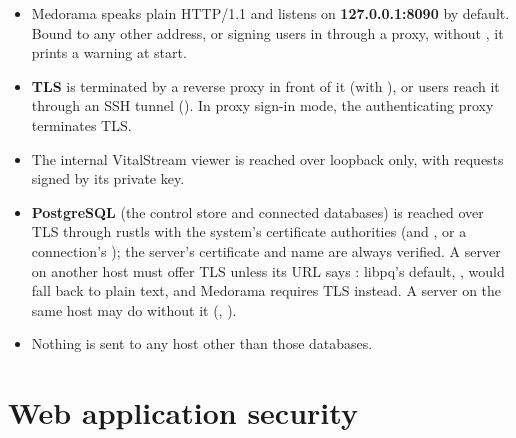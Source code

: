 \begin{itemize}
\item Medorama speaks plain HTTP/1.1 and listens on \textbf{127.0.0.1:8090} by default. Bound to
  any other address, or signing users in through a proxy, without ,
  it prints a warning at start.
\item \textbf{TLS} is terminated by a reverse proxy in front of it (with
  ), or users reach it through an SSH tunnel
  (). In proxy sign-in mode, the authenticating
  proxy terminates TLS.
\item The internal VitalStream viewer is reached over loopback only, with requests signed by its
  private key.
\item \textbf{PostgreSQL} (the control store and connected databases) is reached over TLS through rustls
  with the system's certificate authorities (and , or a connection's
  ); the server's certificate and name are always verified. A server on another
  host must offer TLS unless its URL says : libpq's default,
  , would fall back to plain text, and Medorama requires TLS instead. A server on
  the same host may do without it (, ).
\item Nothing is sent to any host other than those databases.
\end{itemize}

\section{Web application security}
\label{sec:security-web}

